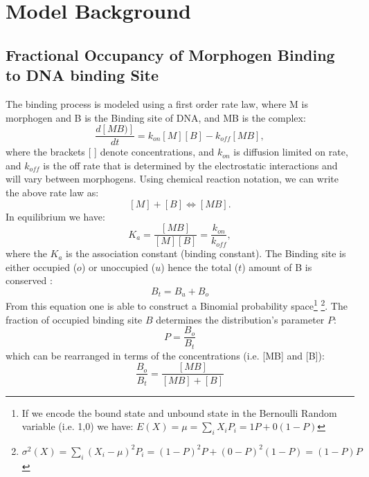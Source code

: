 
 \section{Model Background}

 \subsection{Fractional Occupancy of Morphogen Binding to DNA binding Site}

The binding process is modeled using a first order rate law, where M is morphogen and B is the Binding site of DNA, and MB is the complex:
\begin{equation}\label{}
    \frac{d [MB)]}{dt}= k_{on}[M][B] - k_{off}[MB],
\end{equation}
where the brackets [ ] denote concentrations, and $k_{on}$ is diffusion limited on rate,  and $k_{off}$ is the off rate that is determined by the electrostatic interactions and will vary between morphogens.  Using chemical reaction notation, we can write the above rate law as:
\begin{equation}\label{}
    [M] + [B] \Leftrightarrow [MB].
\end{equation}
In equilibrium we have:
\begin{equation}\label{ka}
  K_{a} =  \frac{[MB]}{[M][B]}= \frac{k_{on} }{k_{off}},
\end{equation}
where the $K_{a}$ is the association constant (binding constant).
The Binding site is either occupied ($o$) or unoccupied ($u$) hence the total ($t$) amount of B is conserved :
\begin{equation}\label{}
    B_{t} = B_{u} + B_{o}
\end{equation}
From this equation one is able to construct a Binomial probability space\footnote[2]{If we encode the bound state and unbound state in the Bernoulli Random variable (i.e. 1,0) we have: $E(X) = \mu = \sum_i X_i P_i = 1 P + 0 (1-P) $} \footnote[3]{ $\sigma^2 (X) =\sum_i (X_i-\mu)^2 P_i = (1-P)^2P + (0-P)^2(1-P) = (1-P)P $ }.  The fraction of occupied binding site $B$ determines the distribution's parameter $P$:
\begin{equation}\label{}
   P = \frac{B_{o}}{B_{t}}
\end{equation}
which can be rearranged in terms of the concentrations (i.e. [MB] and [B]):
\begin{equation}\label{Zb}
    \frac{B_{o}}{B_{t}} =\frac{[MB]}{[MB] + [B]}
\end{equation}

